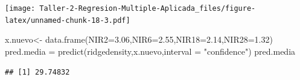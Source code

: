 \documentclass[
]{article}
\newenvironment{Shaded}{\begin{snugshade}}{\end{snugshade}}
\newcommand{\AttributeTok}[1]{\textcolor[rgb]{0.77,0.63,0.00}{#1}}
\newcommand{\FloatTok}[1]{\textcolor[rgb]{0.00,0.00,0.81}{#1}}
\newcommand{\FunctionTok}[1]{\textcolor[rgb]{0.00,0.00,0.00}{#1}}
\newcommand{\NormalTok}[1]{#1}
\newcommand{\OtherTok}[1]{\textcolor[rgb]{0.56,0.35,0.01}{#1}}
\newcommand{\StringTok}[1]{\textcolor[rgb]{0.31,0.60,0.02}{#1}}
\begin{document}
\texttt{[image: Taller-2-Regresion-Multiple-Aplicada\_files/figure-latex/unnamed-chunk-18-3.pdf]}

\begin{Shaded}
\begin{Highlighting}[]
\NormalTok{x.nuevo}\OtherTok{\textless{}{-}} \FunctionTok{data.frame}\NormalTok{(}\AttributeTok{NIR2=}\FloatTok{3.06}\NormalTok{,}\AttributeTok{NIR6=}\FloatTok{2.55}\NormalTok{,}\AttributeTok{NIR18=}\FloatTok{2.14}\NormalTok{,}\AttributeTok{NIR28=}\FloatTok{1.32}\NormalTok{)}
\NormalTok{pred.media }\OtherTok{=} \FunctionTok{predict}\NormalTok{(ridgedensity,x.nuevo,}\AttributeTok{interval =} \StringTok{"confidence"}\NormalTok{)}
\NormalTok{pred.media}
\end{Highlighting}
\end{Shaded}

\begin{verbatim}
## [1] 29.74832
\end{verbatim}
\end{document}
